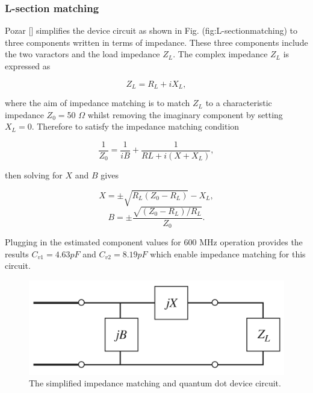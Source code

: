 \subsubsection{\label{subsubsec:L-sectionmatching}L-section matching}
\noindent Pozar [] simplifies the device circuit as shown in Fig. (fig:L-sectionmatching) to three components written in terms of impedance. These three components include the two varactors and the load impedance $Z_{L}$. The complex impedance $Z_{L}$ is expressed as

\begin{equation}
\label{eq:compleximpedance}
Z_{L}=R_{L}+i X_{L},
\end{equation}


\noindent where the aim of impedance matching is to match $Z_{L}$ to a characteristic impedance $Z_{0}=$50 $\Omega$ whilst removing the imaginary component by setting $X_{L}=0$. Therefore to satisfy the impedance matching condition

\begin{equation}
\label{eq:compleximpedance}
\frac{1}{Z_{0}}=\frac{1}{iB}+\frac{1}{RL + i(X+X_{L})},
\end{equation}

\noindent then solving for $X$ and $B$ gives

\begin{equation}
\label{eq:Xsolved}
X=\pm \sqrt{R_{L}(Z_{0} − R_{L})}-X_{L},
\end{equation}
\begin{equation}
\label{eq:Bsolved}
B=\pm \frac{\sqrt{(Z_{0} − R_{L})/R_{L}}}{Z_{0}}.
\end{equation}

\noindent Plugging in the estimated component values for 600 MHz operation provides the results $C_{v1}=4.63 pF$ and $C_{v2}=8.19 pF$ which enable impedance matching for this circuit.  

\begin{figure}[t]
\centering
\includegraphics[height=0.2\textwidth,keepaspectratio]{L-sectionmatching}
\caption{\label{fig:L-sectionmatching} The simplified impedance matching and quantum dot device circuit\citep{pozar2004microwave}.}
\end{figure}

